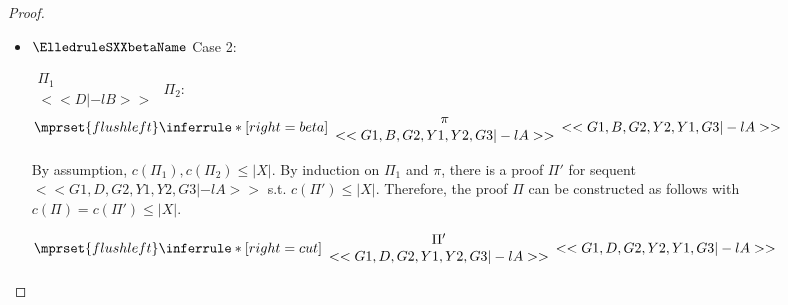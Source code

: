 \begin{proof}
\begin{enumerate}
\begin{itemize}
    \item $\ElledruleSXXbetaName$ Case 2:
      \begin{center}
        \scriptsize
        \begin{math}
          \begin{array}{c}
            \Pi_1 \\
            {<<D |-l B>>}
          \end{array}
        \end{math}
        \qquad\qquad
        $\Pi_2$:
        \begin{math}
          $$\mprset{flushleft}
          \inferrule* [right={\tiny beta}] {
            {
              \begin{array}{c}
                \pi \\
                {<<G1, B, G2, Y1, Y2, G3 |-l A>>}
              \end{array}
            }
          }{<<G1, B, G2, Y2, Y1, G3 |-l A>>}
        \end{math}
      \end{center}
      By assumption, $c(\Pi_1),c(\Pi_2)\leq |X|$. By induction on $\Pi_1$ and $\pi$, there is
      a proof $\Pi'$ for sequent $<<G1, D, G2, Y1, Y2, G3 |-l A>>$ s.t. $c(\Pi') \leq |X|$.
      Therefore, the proof $\Pi$ can be constructed as follows with
      $c(\Pi) = c(\Pi') \leq |X|$.
      \begin{center}
        \scriptsize
        \begin{math}
          $$\mprset{flushleft}
          \inferrule* [right={\tiny cut}] {
            {
              \begin{array}{cc}
                \Pi' \\
                {<<G1, D, G2, Y1, Y2, G3 |-l A>>}
              \end{array}
            }
          }{<<G1, D, G2, Y2, Y1, G3 |-l A>>}
        \end{math}
      \end{center}


\end{itemize}
\end{enumerate}
\end{proof}
